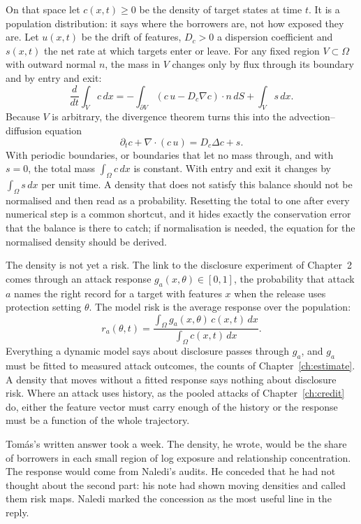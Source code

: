 On that space let $c(x,t)\ge0$ be the density of target states at time $t$. It is a population
distribution: it says where the borrowers are, not how exposed they are. Let $u(x,t)$ be the
drift of features, $D_c>0$ a dispersion coefficient and $s(x,t)$ the net rate at which targets enter
or leave. For any fixed region $V\subset\Omega$ with outward normal $n$, the mass in $V$ changes only
by flux through its boundary and by entry and exit:
\begin{equation}\label{c20:eq-balance}
\frac{d}{dt}\int_V c\,dx=-\int_{\partial V}(c\,u-D_c\nabla c)\cdot n\,dS+\int_V s\,dx.
\end{equation}
Because $V$ is arbitrary, the divergence theorem turns this into the advection--diffusion equation
\begin{equation}\label{c20:eq-ad}
\partial_t c+\nabla\!\cdot(c\,u)=D_c\Delta c+s.
\end{equation}
With periodic boundaries, or boundaries that let no mass through, and with $s=0$, the total
mass $\int_\Omega c\,dx$ is constant. With entry and exit it changes by $\int_\Omega s\,dx$ per unit time. A density
that does not satisfy this balance should not be normalised and then read as a probability.
Resetting the total to one after every numerical step is a common shortcut, and it hides
exactly the conservation error that the balance is there to catch; if normalisation is needed,
the equation for the normalised density should be derived.

The density is not yet a risk. The link to the disclosure experiment of Chapter~2 comes
through an attack response $g_a(x,\theta)\in[0,1]$, the probability that attack $a$ names the right
record for a target with features $x$ when the release uses protection setting $\theta$. The model
risk is the average response over the population:
\begin{equation}\label{c20:eq-risk}
r_a(\theta,t)=\frac{\int_\Omega g_a(x,\theta)\,c(x,t)\,dx}{\int_\Omega c(x,t)\,dx}.
\end{equation}
Everything a dynamic model says about disclosure passes through $g_a$, and $g_a$ must be fitted
to measured attack outcomes, the counts of Chapter~\ref{ch:estimate}. A density that moves without a fitted
response says nothing about disclosure risk. Where an attack uses history, as the pooled
attacks of Chapter~\ref{ch:credit} do, either the feature vector must carry enough of the history or the
response must be a function of the whole trajectory.

Tom\'as's written answer took a week. The density, he wrote, would be the share of borrowers in each small region of log exposure and relationship concentration. The response
would come from Naledi's audits. He conceded that he had not thought about the second
part: his note had shown moving densities and called them risk maps. Naledi marked the
concession as the most useful line in the reply.

